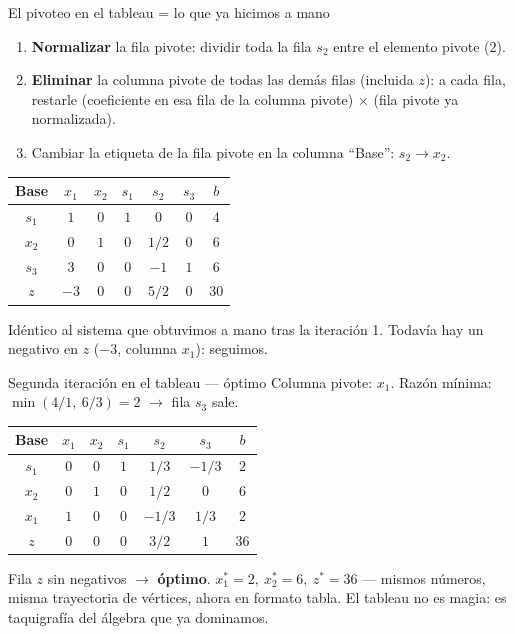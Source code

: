 \documentclass[aspectratio=169]{beamer}
\begin{document}
\begin{frame}{El pivoteo en el tableau = lo que ya hicimos a mano}
\begin{enumerate}
\item \textbf{Normalizar} la fila pivote: dividir toda la fila $s_2$ entre el elemento pivote ($2$).
\item \textbf{Eliminar} la columna pivote de todas las demás filas (incluida $z$): a cada fila, restarle (coeficiente en esa fila de la columna pivote) $\times$ (fila pivote ya normalizada).
\item Cambiar la etiqueta de la fila pivote en la columna ``Base'': $s_2 \to x_2$.
\end{enumerate}

\vspace{-0.15cm}
\begin{center}
\renewcommand{\arraystretch}{1.15}
\begin{tabular}{c|ccccc|c}
\textbf{Base} & $x_1$ & $x_2$ & $s_1$ & $s_2$ & $s_3$ & $b$ \\
\hline
$s_1$ & $1$ & $0$ & $1$ & $0$ & $0$ & $4$ \\
$x_2$ & $0$ & $1$ & $0$ & $1/2$ & $0$ & $6$ \\
$s_3$ & \cellcolor{entra!20}$3$ & $0$ & $0$ & $-1$ & $1$ & $6$ \\
\hline
$z$ & \cellcolor{entra!20}$-3$ & $0$ & $0$ & $5/2$ & $0$ & $30$ \\
\end{tabular}
\end{center}
\vspace{-0.1cm}
\small Idéntico al sistema que obtuvimos a mano tras la iteración 1. Todavía hay un negativo en $z$ ($-3$, columna $x_1$): seguimos.
\end{frame}

\begin{frame}{Segunda iteración en el tableau --- óptimo}
Columna pivote: $x_1$. Razón mínima: $\min(4/1,\ 6/3)=2$ $\to$ fila $s_3$ sale.

\begin{center}
\renewcommand{\arraystretch}{1.3}
\begin{tabular}{c|ccccc|c}
\textbf{Base} & $x_1$ & $x_2$ & $s_1$ & $s_2$ & $s_3$ & $b$ \\
\hline
$s_1$ & $0$ & $0$ & $1$ & $1/3$ & $-1/3$ & $2$ \\
$x_2$ & $0$ & $1$ & $0$ & $1/2$ & $0$ & $6$ \\
$x_1$ & $1$ & $0$ & $0$ & $-1/3$ & $1/3$ & $2$ \\
\hline
$z$ & $0$ & $0$ & $0$ & $3/2$ & $1$ & $36$ \\
\end{tabular}
\end{center}

Fila $z$ sin negativos $\to$ \textbf{óptimo}. $x_1^\ast=2,\ x_2^\ast=6,\ z^\ast=36$ --- mismos números, misma trayectoria de vértices, ahora en formato tabla. El tableau no es magia: es taquigrafía del álgebra que ya dominamos.
\end{frame}
\end{document}
